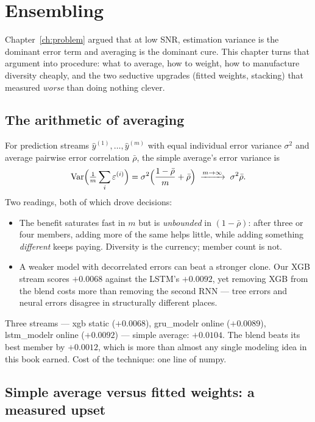 \chapter{Ensembling}
\label{ch:ensembling}

Chapter~\ref{ch:problem} argued that at low SNR, estimation variance is the
dominant error term and averaging is the dominant cure. This chapter turns
that argument into procedure: what to average, how to weight, how to
manufacture diversity cheaply, and the two seductive upgrades (fitted
weights, stacking) that measured \emph{worse} than doing nothing clever.

\section{The arithmetic of averaging}

For prediction streams $\hat y^{(1)}, \dots, \hat y^{(m)}$ with equal
individual error variance $\sigma^2$ and average pairwise error correlation
$\bar\rho$, the simple average's error variance is
\[
\operatorname{Var}\!\Big(\tfrac{1}{m}\sum_i \varepsilon^{(i)}\Big)
= \sigma^2\Big(\frac{1-\bar\rho}{m} + \bar\rho\Big)
\;\xrightarrow{m \to \infty}\; \sigma^2 \bar\rho .
\]
Two readings, both of which drove decisions:

\begin{itemize}
\item The benefit saturates fast in $m$ but is \emph{unbounded} in
  $(1-\bar\rho)$: after three or four members, adding more of the same
  helps little, while adding something \emph{different} keeps paying.
  Diversity is the currency; member count is not.
\item A weaker model with decorrelated errors can beat a stronger clone.
  Our XGB stream scores $+0.0068$ against the LSTM's $+0.0092$, yet
  removing XGB from the blend costs more than removing the second RNN ---
  tree errors and neural errors disagree in structurally different
  places.
\end{itemize}

\begin{jsbox}
Three streams --- xgb static ($+0.0068$), gru\_modelr online ($+0.0089$),
lstm\_modelr online ($+0.0092$) --- simple average: $\bm{+0.0104}$.
The blend beats its best member by $+0.0012$, which is more than almost
any single modeling idea in this book earned. Cost of the technique:
one line of numpy.
\end{jsbox}

\section{Simple average versus fitted weights: a measured upset}

